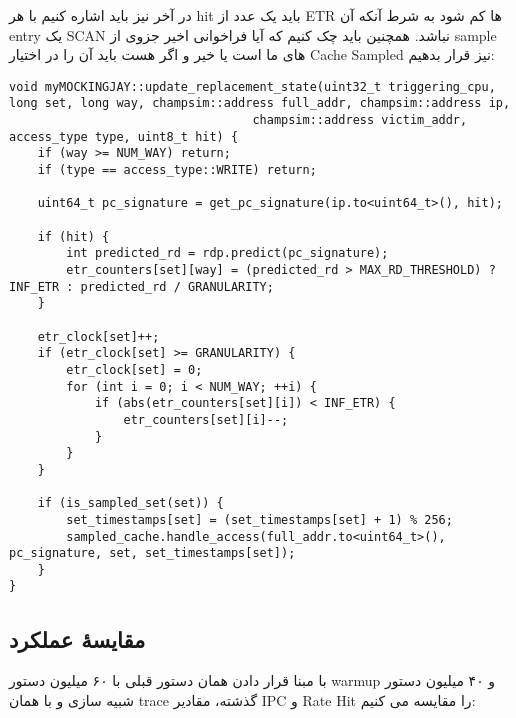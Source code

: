 \documentclass[17pt]{article}
\begin{document}
در آخر نیز باید اشاره کنیم با هر hit باید یک عدد از ETR ها کم شود به شرط آنکه آن entry یک SCAN نباشد. همچنین باید چک کنیم که آیا فراخوانی اخیر جزوی از sample های ما است یا خیر و اگر هست باید آن را در اختیار Cache Sampled نیز قرار بدهیم:

\begin{LTR}
\begin{lstlisting}
void myMOCKINGJAY::update_replacement_state(uint32_t triggering_cpu, long set, long way, champsim::address full_addr, champsim::address ip,
                                  champsim::address victim_addr, access_type type, uint8_t hit) {
    if (way >= NUM_WAY) return;
    if (type == access_type::WRITE) return;

    uint64_t pc_signature = get_pc_signature(ip.to<uint64_t>(), hit);

    if (hit) {
        int predicted_rd = rdp.predict(pc_signature);
        etr_counters[set][way] = (predicted_rd > MAX_RD_THRESHOLD) ? INF_ETR : predicted_rd / GRANULARITY;
    }

    etr_clock[set]++;
    if (etr_clock[set] >= GRANULARITY) {
        etr_clock[set] = 0;
        for (int i = 0; i < NUM_WAY; ++i) {
            if (abs(etr_counters[set][i]) < INF_ETR) {
                etr_counters[set][i]--;
            }
        }
    }
    
    if (is_sampled_set(set)) {
        set_timestamps[set] = (set_timestamps[set] + 1) % 256;
        sampled_cache.handle_access(full_addr.to<uint64_t>(), pc_signature, set, set_timestamps[set]);
    }
}
\end{lstlisting}
\end{LTR}

\subsection{مقایسهٔ عملکرد}
با مبنا قرار دادن همان دستور قبلی با ۶۰ میلیون دستور warmup و ۴۰ میلیون دستور شبیه سازی و با همان trace گذشته، مقادیر IPC و Rate Hit را مقایسه می کنیم:

\begin{latin}
\begin{figure}[h]
\centering
{}
\label{fig:ipc_hbars}
\end{figure}
\end{latin}
\end{document}
